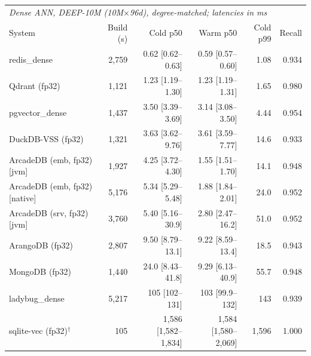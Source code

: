 \begin{tabular}{lrrrrr}
\toprule
\multicolumn{6}{l}{\textit{Dense ANN, DEEP-10M (10M$\times$96d), degree-matched; latencies in ms}} \\
System & Build (s) & Cold p50 & Warm p50 & Cold p99 & Recall \\
\midrule
redis_dense & 2{,}759 & 0.62 [0.62--0.63] & 0.59 [0.57--0.60] & 1.08 & 0.934 \\
Qdrant (fp32) & 1{,}121 & 1.23 [1.19--1.30] & 1.23 [1.19--1.31] & 1.65 & 0.980 \\
pgvector_dense & 1{,}437 & 3.50 [3.39--3.69] & 3.14 [3.08--3.50] & 4.44 & 0.954 \\
DuckDB-VSS (fp32) & 1{,}321 & 3.63 [3.62--9.76] & 3.61 [3.59--7.77] & 14.6 & 0.933 \\
ArcadeDB (emb, fp32) [jvm] & 1{,}927 & 4.25 [3.72--4.30] & 1.55 [1.51--1.70] & 14.1 & 0.948 \\
ArcadeDB (emb, fp32) [native] & 5{,}176 & 5.34 [5.29--5.48] & 1.88 [1.84--2.01] & 24.0 & 0.952 \\
ArcadeDB (srv, fp32) [jvm] & 3{,}760 & 5.40 [5.16--30.9] & 2.80 [2.47--16.2] & 51.0 & 0.952 \\
ArangoDB (fp32) & 2{,}807 & 9.50 [8.79--13.1] & 9.22 [8.59--13.4] & 18.5 & 0.943 \\
MongoDB (fp32) & 1{,}440 & 24.0 [8.43--41.8] & 9.29 [6.13--40.9] & 55.7 & 0.948 \\
ladybug_dense & 5{,}217 & 105 [102--131] & 103 [99.9--132] & 143 & 0.939 \\
sqlite-vec (fp32)$^{\dagger}$ & 105 & 1{,}586 [1{,}582--1{,}834] & 1{,}584 [1{,}580--2{,}069] & 1{,}596 & 1.000 \\
\bottomrule
\end{tabular}
